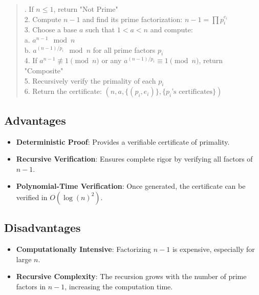\documentclass[12pt]{article}
\begin{document}
\begin{quote}. If \( n \leq 1 \), return "Not Prime" \\
2. Compute \( n-1 \) and find its prime factorization: \( n-1 = \prod p_i^{e_i} \) \\
3. Choose a base \( a \) such that \( 1 < a < n \) and compute: \\
\hspace*{2em} a. \( a^{n-1} \mod n \) \\
\hspace*{2em} b. \( a^{(n-1)/p_i} \mod n \) for all prime factors \( p_i \) \\
4. If \( a^{n-1} \not\equiv 1 \pmod{n} \) or any \( a^{(n-1)/p_i} \equiv 1 \pmod{n} \), return "Composite" \\
5. Recursively verify the primality of each \( p_i \) \\
6. Return the certificate: \( (n, a, \{(p_i, e_i)\}, \{p_i \text{'s certificates}\}) \)
\end{quote}

\subsection*{Advantages}

\begin{itemize}
    \item \textbf{Deterministic Proof}: Provides a verifiable certificate of primality.
    \item \textbf{Recursive Verification}: Ensures complete rigor by verifying all factors of \( n-1 \).
    \item \textbf{Polynomial-Time Verification}: Once generated, the certificate can be verified in \( O(\log(n)^2) \).
\end{itemize}

\subsection*{Disadvantages}

\begin{itemize}
    \item \textbf{Computationally Intensive}: Factorizing \( n-1 \) is expensive, especially for large \( n \).
    \item \textbf{Recursive Complexity}: The recursion grows with the number of prime factors in \( n-1 \), increasing the computation time.
\end{itemize}
\end{document}
